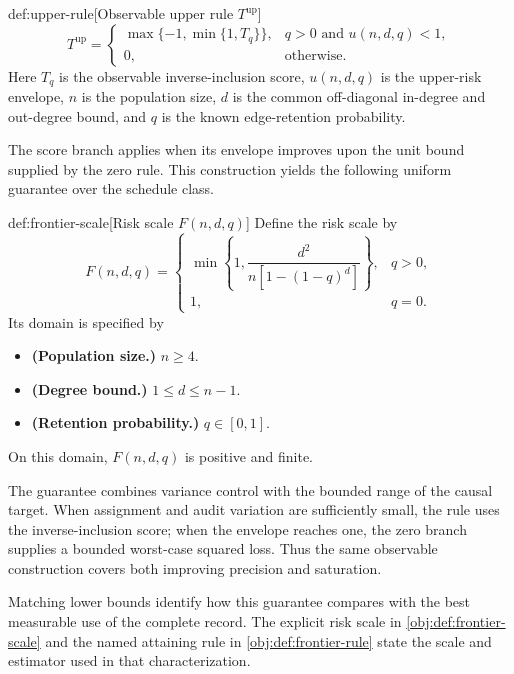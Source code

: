 \documentclass[11pt]{article}
\begin{document}
\begin{definitionv}{def:upper-rule}[Observable upper rule $T^{\mathrm{up}}$]
\[
T^{\mathrm{up}}
=
\begin{cases}
\max\{-1,\min\{1,T_q\}\},&q>0\text{ and }u(n,d,q)<1,\\
0,&\text{otherwise}.
\end{cases}
\]
Here \(T_q\) is the observable inverse-inclusion score, \(u(n,d,q)\) is the upper-risk envelope, \(n\) is the population size, \(d\) is the common off-diagonal in-degree and out-degree bound, and \(q\) is the known edge-retention probability.
\end{definitionv}

The score branch applies when its envelope improves upon the unit bound supplied by the zero rule. This construction yields the following uniform guarantee over the schedule class.

\begin{definitionv}{def:frontier-scale}[Risk scale $F(n,d,q)$]
Define the risk scale by
\[
F(n,d,q)=
\begin{cases}
\min\left\{1,\dfrac{d^2}{n[1-(1-q)^d]}\right\},&q>0,\\
1,&q=0.
\end{cases}
\]
Its domain is specified by
\begin{itemize}
\item \textbf{(Population size.)} \(n\ge4\).
\item \textbf{(Degree bound.)} \(1\le d\le n-1\).
\item \textbf{(Retention probability.)} \(q\in[0,1]\).
\end{itemize}
On this domain, \(F(n,d,q)\) is positive and finite.
\end{definitionv}

The guarantee combines variance control with the bounded range of the causal target. When assignment and audit variation are sufficiently small, the rule uses the inverse-inclusion score; when the envelope reaches one, the zero branch supplies a bounded worst-case squared loss. Thus the same observable construction covers both improving precision and saturation.

Matching lower bounds identify how this guarantee compares with the best measurable use of the complete record. The explicit risk scale  in \cref{obj:def:frontier-scale} and the named attaining rule  in \cref{obj:def:frontier-rule} state the scale and estimator used in that characterization.
\end{document}

